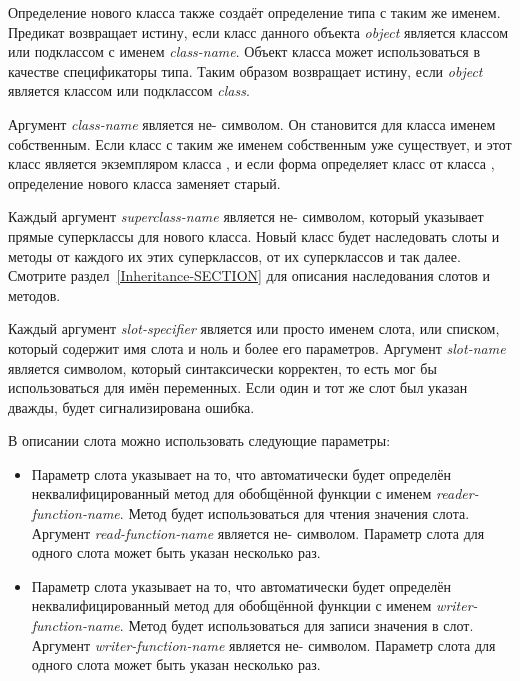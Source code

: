 \begin{defmac}
Определение нового класса также создаёт определение типа с таким же
именем. Предикат  возвращает истину, если
класс данного объекта \emph{object} является классом или подклассом
с именем \emph{class-name}. Объект класса может использоваться в качестве спецификаторы
типа. Таким образом  возвращает истину, если
\emph{object} является классом или подклассом \emph{class}.

Аргумент \emph{class-name} является не- символом. Он становится для
класса именем собственным. Если класс с таким же именем собственным уже
существует, и этот класс является экземпляром класса , и если
форма  определяет класс от класса ,
определение нового класса заменяет старый.

Каждый аргумент \emph{superclass-name} является не- символом, который
указывает прямые суперклассы для нового класса. Новый класс будет наследовать
слоты и методы от каждого их этих суперклассов, от их суперклассов и так
далее. Смотрите раздел~\ref{Inheritance-SECTION} для описания наследования
слотов и методов.

Каждый аргумент \emph{slot-specifier} является или просто именем слота, или
списком, который содержит имя слота и ноль и более его параметров.
Аргумент \emph{slot-name} является символом, который синтаксически корректен, то
есть мог бы использоваться для имён переменных. Если один и тот же слот был
указан дважды, будет сигнализирована ошибка.

В описании слота можно использовать следующие параметры:

\begin{itemize}

\item
Параметр слота  указывает на то, что автоматически будет определён
неквалифицированный метод для обобщённой функции с именем
\emph{reader-function-name}. Метод будет использоваться для чтения значения
слота.
Аргумент \emph{read-function-name} является не- символом. Параметр
слота  для одного слота может быть указан несколько раз.

\item 
Параметр слота  указывает на то, что автоматически будет определён
неквалифицированный метод для обобщённой функции с именем
\emph{writer-function-name}. Метод будет использоваться для записи значения
в слот.
Аргумент \emph{writer-function-name} является не- символом. Параметр
слота  для одного слота может быть указан несколько раз.


\end{itemize}
\end{defmac}
